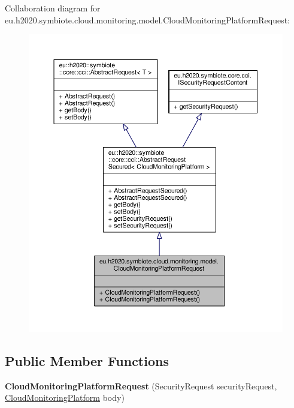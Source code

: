 Collaboration diagram for eu.\+h2020.\+symbiote.\+cloud.\+monitoring.\+model.\+Cloud\+Monitoring\+Platform\+Request\+:\nopagebreak
\begin{figure}[H]
\begin{center}
\leavevmode
\includegraphics[width=350pt]{classeu_1_1h2020_1_1symbiote_1_1cloud_1_1monitoring_1_1model_1_1CloudMonitoringPlatformRequest__coll__graph}
\end{center}
\end{figure}
\subsection*{Public Member Functions}
\begin{DoxyCompactItemize}
\item 
\mbox{\label{classeu_1_1h2020_1_1symbiote_1_1cloud_1_1monitoring_1_1model_1_1CloudMonitoringPlatformRequest_a2edc55f74302b3ec8ab1d599aebe4995}} 
{\bfseries Cloud\+Monitoring\+Platform\+Request} (Security\+Request security\+Request, \hyperlink{classeu_1_1h2020_1_1symbiote_1_1cloud_1_1monitoring_1_1model_1_1CloudMonitoringPlatform}{Cloud\+Monitoring\+Platform} body)
\end{DoxyCompactItemize}


